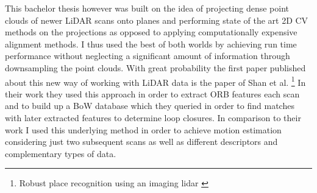 This bachelor thesis however was built on the idea of projecting dense point clouds of newer LiDAR scans onto planes and performing state of the art 2D CV methods on the projections as opposed to applying computationally expensive alignment methods. I thus used the best of both worlds by achieving run time performance without neglecting a significant amount of information through downsampling the point clouds. 
\clearpage
With great probability the first paper published about this new way of working with LiDAR data is the paper of Shan et al. \footnote{Robust place recognition using an imaging lidar \citep{robust2021shan}} In their work they used this approach in order to extract ORB features each scan and to build up a BoW database which they queried in order to find matches with later extracted features to determine loop closures. In comparison to their work I used this underlying method in order to achieve motion estimation considering just two subsequent scans as well as different descriptors and complementary types of data.

